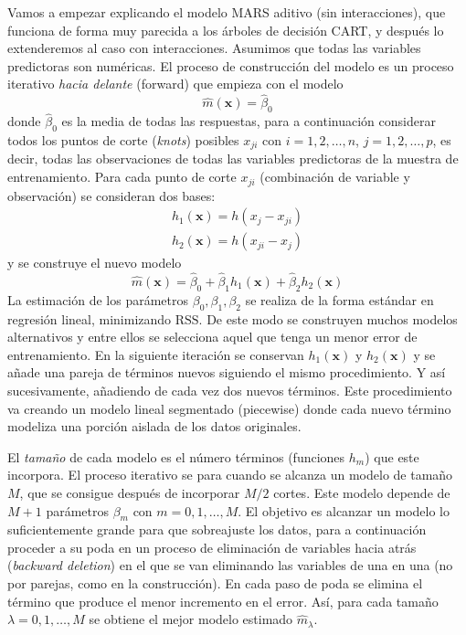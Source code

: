 \documentclass[
]{book}
\theoremstyle{break}
\theoremstyle{nonumberplain}
\begin{document}
Vamos a empezar explicando el modelo MARS aditivo (sin interacciones), que funciona de forma muy parecida a los árboles de decisión CART, y después lo extenderemos al caso con interacciones.
Asumimos que todas las variables predictoras son numéricas. El proceso de construcción del modelo es un proceso iterativo \emph{hacia delante} (forward) que empieza con el modelo
\[\hat m(\mathbf{x}) = \hat \beta_0 \]
donde \(\hat \beta_0\) es la media de todas las respuestas, para a continuación considerar todos los puntos de corte (\emph{knots}) posibles \(x_{ji}\) con \(i = 1, 2, \ldots, n\), \(j = 1, 2, \ldots, p\), es decir, todas las observaciones de todas las variables predictoras de la muestra de entrenamiento.
Para cada punto de corte \(x_{ji}\) (combinación de variable y observación) se consideran dos bases:
\[ \begin{aligned}
h_1(\mathbf{x}) = h(x_j - x_{ji}) \\
h_2(\mathbf{x}) = h(x_{ji} - x_j)
\end{aligned}\]
y se construye el nuevo modelo
\[\hat m(\mathbf{x}) = \hat \beta_0 + \hat \beta_1 h_1(\mathbf{x}) + \hat \beta_2 h_2(\mathbf{x})\]
La estimación de los parámetros \(\beta_0, \beta_1, \beta_2\) se realiza de la forma estándar en regresión lineal, minimizando \(\mbox{RSS}\). De este modo se construyen muchos modelos alternativos y entre ellos se selecciona aquel que tenga un menor error de entrenamiento. En la siguiente iteración se conservan \(h_1(\mathbf{x})\) y \(h_2(\mathbf{x})\) y se añade una pareja de términos nuevos siguiendo el mismo procedimiento. Y así sucesivamente, añadiendo de cada vez dos nuevos términos. Este procedimiento va creando un modelo lineal segmentado (piecewise) donde cada nuevo término modeliza una porción aislada de los datos originales.

El \emph{tamaño} de cada modelo es el número términos (funciones \(h_m\)) que este incorpora. El proceso iterativo se para cuando se alcanza un modelo de tamaño \(M\), que se consigue después de incorporar \(M/2\) cortes. Este modelo depende de \(M+1\) parámetros \(\beta_m\) con \(m=0,1,\ldots,M\). El objetivo es alcanzar un modelo lo suficientemente grande para que sobreajuste los datos, para a continuación proceder a su poda en un proceso de eliminación de variables hacia atrás (\emph{backward deletion}) en el que se van eliminando las variables de una en una (no por parejas, como en la construcción). En cada paso de poda se elimina el término que produce el menor incremento en el error. Así, para cada tamaño \(\lambda = 0,1,\ldots, M\) se obtiene el mejor modelo estimado \(\hat{m}_{\lambda}\).
\end{document}
